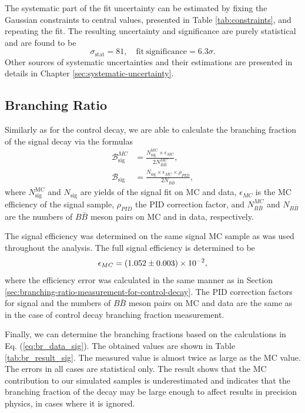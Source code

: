 The systematic part of the fit uncertainty can be estimated by fixing the Gaussian constraints to central values, presented in Table \ref{tab:constraints}, and repeating the fit. The resulting uncertainty and significance are purely statistical and are found to be
\begin{equation}
\sigma_{\mathrm{stat}} = 81,\quad\mathrm{fit~significance} = 6.3\sigma.
\end{equation}
Other sources of systematic uncertainties and their estimations are presented in details in Chapter \ref{sec:systematic-uncertainty}.

\subsection{Branching Ratio}\label{sec:branching-ratio-calculation-for-signal-decay}

Similarly as for the control decay, we are able to calculate the branching fraction of the signal decay via the formulas
\begin{align}
\mathcal{B}^{MC}_{\mathrm{sig}} &= \frac{N^{\mathrm{MC}}_\mathrm{sig} \times \epsilon_{MC}}{2N_{B\bar B}^{MC}},\\
\mathcal{B}_{\mathrm{sig}} &= \frac{N_\mathrm{sig} \times \epsilon_{MC} \times \rho_{PID}}{2N_{B\bar B}},
\label{eq:br_data_sig}
\end{align}
where $N^{\mathrm{MC}}_\mathrm{sig}$ and $N_\mathrm{sig}$ are yields of the signal fit on MC and data, $\epsilon_{MC}$ is the MC efficiency of the signal sample, $\rho_{PID}$ the PID correction factor, and $N_{B\bar B}^{MC}$ and $N_{B\bar B}$ are the numbers of $B \bar B$ meson pairs on MC and in data, respectively.

The signal efficiency was determined on the same signal MC sample as was used throughout the analysis. The full signal efficiency is determined to be
\begin{equation*}
\epsilon_{MC} = (1.052 \pm 0.003)\times 10^{-2},
\end{equation*}
where the efficiency error was calculated in the same manner as in Section \ref{sec:branching-ratio-measurement-for-control-decay}. The PID correction factors for signal and the numbers of $B\bar B$ meson pairs on MC and data are the same as in the case of control decay branching fraction measurement.

Finally, we can determine the branching fractions based on the calculations in Eq. (\ref{eq:br_data_sig}). The obtained values are shown in Table \ref{tab:br_result_sig}. The measured value is almost twice as large as the MC value. The errors in all cases are statistical only. The result shows that the MC contribution to our simulated samples is underestimated and indicates that the branching fraction of the decay may be large enough to affect results in precision physics, in cases where it is ignored.

